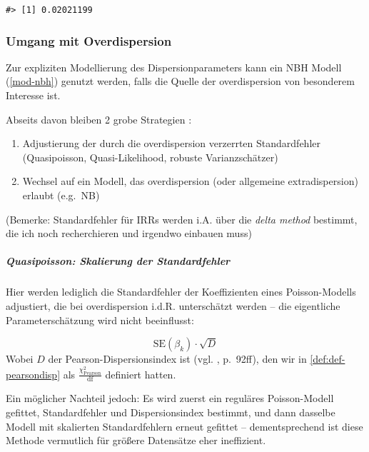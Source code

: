 \documentclass[ngerman,a4paper,]{scrartcl}
\providecommand{\tightlist}{%
  \setlength{\itemsep}{0pt}\setlength{\parskip}{0pt}}
\let\oldsubparagraph\subparagraph
\renewcommand{\subparagraph}[1]{\oldsubparagraph{#1}\mbox{}}
\theoremstyle{definition}
\theoremstyle{definition}
\theoremstyle{definition}
\theoremstyle{remark}
\begin{document}
\begin{verbatim}
#> [1] 0.02021199
\end{verbatim}

\hypertarget{umgang-mit-overdispersion}{%
\subsubsection{Umgang mit Overdispersion}\label{umgang-mit-overdispersion}}

Zur expliziten Modellierung des Dispersionparameters kann ein NBH Modell (\ref{mod-nbh}) genutzt werden, falls die Quelle der overdispersion von besonderem Interesse ist.

Abseits davon bleiben 2 grobe Strategien :

\begin{enumerate}
\def\labelenumi{\arabic{enumi}.}
\tightlist
\item
  Adjustierung der durch die overdispersion verzerrten Standardfehler (Quasipoisson, Quasi-Likelihood, robuste Varianzschätzer)
\item
  Wechsel auf ein Modell, das overdispersion (oder allgemeine extradispersion) erlaubt (e.g.~NB)
\end{enumerate}

(Bemerke: Standardfehler für IRRs werden i.A. über die \emph{delta method} bestimmt, die ich noch recherchieren und irgendwo einbauen muss)

\hypertarget{quasipoisson-skalierung-der-standardfehler}{%
\subparagraph{Quasipoisson: Skalierung der Standardfehler}\label{quasipoisson-skalierung-der-standardfehler}}

Hier werden lediglich die Standardfehler der Koeffizienten eines Poisson-Modells adjustiert, die bei overdispersion i.d.R. unterschätzt werden -- die eigentliche Parameterschätzung wird nicht beeinflusst:

\[\mathrm{SE}(\beta_k) \cdot \sqrt{D}\]
Wobei \(D\) der Pearson-Dispersionsindex ist (vgl. \citet{hilbeModelingCountData2014}, p.~92ff), den wir in \ref{def:def-pearsondisp} als \(\frac{\chi^2_{\mathrm{Pearson}}}{\mathrm{df}}\) definiert hatten.

Ein möglicher Nachteil jedoch: Es wird zuerst ein reguläres Poisson-Modell gefittet, Standardfehler und Dispersionsindex bestimmt, und dann dasselbe Modell mit skalierten Standardfehlern erneut gefittet -- dementsprechend ist diese Methode vermutlich für größere Datensätze eher ineffizient.
\end{document}
